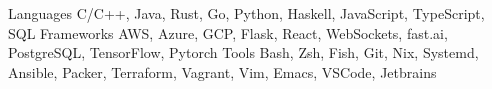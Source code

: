 \vspace{6mm}

\begin{cvskills}
  \cvskill
    {Languages}
    {C/C++, Java, Rust, Go, Python, Haskell, JavaScript, TypeScript, SQL}
  \cvskill
    {Frameworks}
    {AWS, Azure, GCP, Flask, React, WebSockets, fast.ai, PostgreSQL, TensorFlow, Pytorch}
  \cvskill
    {Tools}
    {Bash, Zsh, Fish, Git, Nix, Systemd, Ansible, Packer, Terraform, Vagrant, Vim, Emacs, VSCode, Jetbrains}
\end{cvskills}
